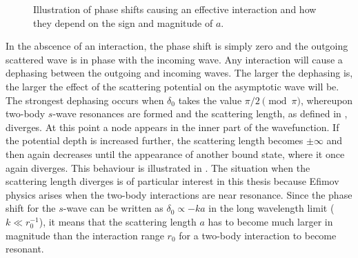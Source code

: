 \begin{figure}[h!]
	\centering
	\hfill %
	\caption{Illustration of phase shifts causing an effective interaction and how they depend on the sign and magnitude of $a$.}\label{fig:phaseshift}
\end{figure}

In the abscence of an interaction, the phase shift is simply zero and the outgoing scattered wave is in phase with the incoming wave. Any interaction will cause a dephasing between the outgoing and incoming waves. The larger the dephasing is, the larger the effect of the scattering potential on the asymptotic wave will be. The strongest dephasing occurs when $\delta_0$ takes the value $\pi/2 \pmod{\pi}$, whereupon two-body $s$-wave resonances are formed and the scattering length, as defined in , diverges. At this point a node appears in the inner part of the wavefunction. If the potential depth is increased further, the scattering length becomes $\pm \infty$ and then again decreases until the appearance of another bound state, where it once again diverges. This behaviour is illustrated in . The situation when the scattering length diverges is of particular interest in this thesis because Efimov physics arises when the two-body interactions are near resonance. Since the phase shift for the $s$-wave can be written as $\delta_0 \propto -ka$ in the long wavelength limit ($k \ll r_0^{-1}$), it means that the scattering length $a$ has to become much larger in magnitude than the interaction range $r_0$ for a two-body interaction to become resonant.

